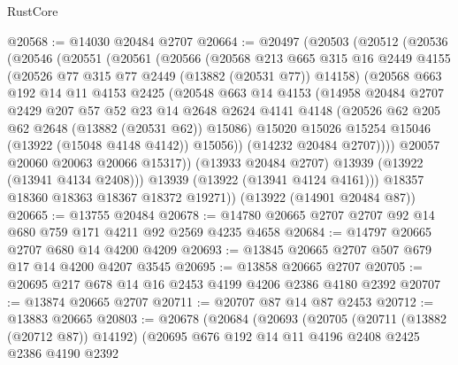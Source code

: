 \begin{lexlean}{RustCore}
\begin{coremodule}
@20568 := @14030 @20484 @2707
@20664 := @20497
    (@20503
      (@20512
        (@20536
          (@20546
            (@20551
              (@20561
                (@20566
                  (@20568
                    @213
                    @665
                    @315
                    @16
                    @2449
                    @4155
                    (@20526 @77 @315 @77 @2449 (@13882 (@20531 @77)) @14158)
                    (@20568
                      @663
                      @192
                      @14
                      @11
                      @4153
                      @2425
                      (@20548
                        @663
                        @14
                        @4153
                        (@14958
                          @20484
                          @2707
                          @2429
                          @207
                          @57
                          @52
                          @23
                          @14
                          @2648
                          @2624
                          @4141
                          @4148
                          (@20526 @62 @205 @62 @2648 (@13882 (@20531 @62)) @15086)
                          @15020
                          @15026
                          @15254
                          @15046
                          (@13922 (@15048 @4148 @4142))
                          @15056))
                      (@14232 @20484 @2707))))
                @20057
                @20060
                @20063
                @20066
                @15317))
            (@13933 @20484 @2707)
            @13939
            (@13922 (@13941 @4134 @2408)))
          @13939
          (@13922 (@13941 @4124 @4161)))
        @18357
        @18360
        @18363
        @18367
        @18372
        @19271))
    (@13922 (@14901 @20484 @87))
@20665 := @13755 @20484
@20678 := @14780 @20665 @2707 @2707 @92 @14 @680 @759 @171 @4211 @92 @2569 @4235 @4658
@20684 := @14797 @20665 @2707 @680 @14 @4200 @4209
@20693 := @13845 @20665 @2707 @507 @679 @17 @14 @4200 @4207 @3545
@20695 := @13858 @20665 @2707
@20705 := @20695 @217 @678 @14 @16 @2453 @4199 @4206 @2386 @4180 @2392
@20707 := @13874 @20665 @2707
@20711 := @20707 @87 @14 @87 @2453
@20712 := @13883 @20665
@20803 := @20678
    (@20684
      (@20693
        (@20705
          (@20711 (@13882 (@20712 @87)) @14192)
          (@20695
            @676
            @192
            @14
            @11
            @4196
            @2408
            @2425
            @2386
            @4190
            @2392

\end{coremodule}
\end{lexlean}
